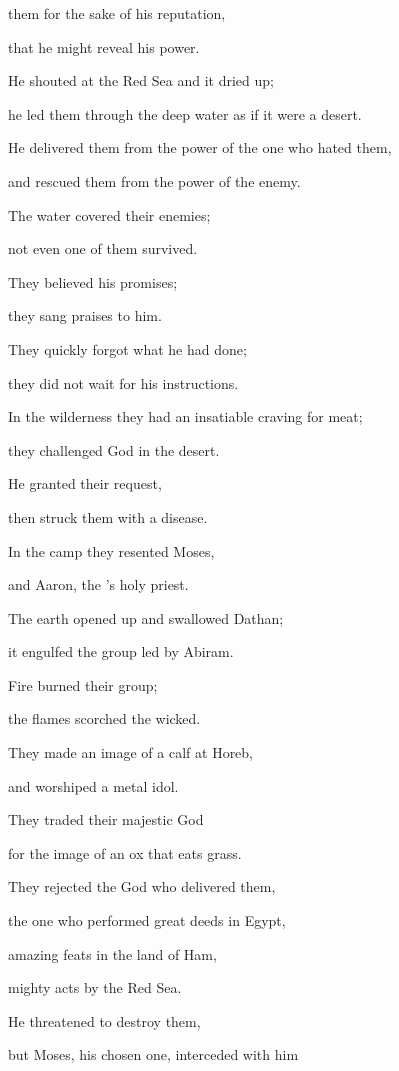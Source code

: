 {them for the sake
of his reputation,
\par }{\Q that
he might reveal
his power.
\par }{\Q {}He shouted
at the Red
Sea
and it dried
up;
\par }{\Q he led
them through the deep
water as if it were a desert.
\par }{\Q {}He delivered
them from the power
of the one who hated
them,
\par }{\Q and rescued
them from the power
of the enemy.
\par }{\Q {}The water
covered
their enemies;
\par }{\Q not
even one
of them
survived.
\par }{\Q {}They believed
his promises;
\par }{\Q they sang
praises to him.
\par }{\Q {}They quickly
forgot
what he had done;
\par }{\Q they did not
wait
for his instructions.
\par }{\Q {}In the wilderness
they had an insatiable
craving
for meat;

\par }{\Q they challenged
God
in the desert.
\par }{\Q {}He granted
their
request,
\par }{\Q then struck
them with a disease.
\par }{\Q {}In the camp
they resented
Moses,
\par }{\Q and Aaron,
the
{}’s
holy priest.
\par }{\Q {}The earth
opened
up
and swallowed
Dathan;
\par }{\Q it engulfed
the group
led by Abiram.
\par }{\Q {}Fire
burned
their group;
\par }{\Q the flames
scorched
the wicked.
\par }{\Q {}They made
an image of a calf
at Horeb,
\par }{\Q and worshiped
a metal idol.
\par }{\Q {}They traded
their majestic
God

\par }{\Q for the image
of an ox
that eats
grass.
\par }{\Q {}They rejected
the God
who delivered
them,
\par }{\Q the one who performed
great
deeds in Egypt,
\par }{\Q {}amazing
feats in the land
of Ham,
\par }{\Q mighty acts
by the Red
Sea.
\par }{\Q {}He threatened
to destroy
them,
\par }{\Q but
Moses,
his chosen one,
interceded
with him

}
